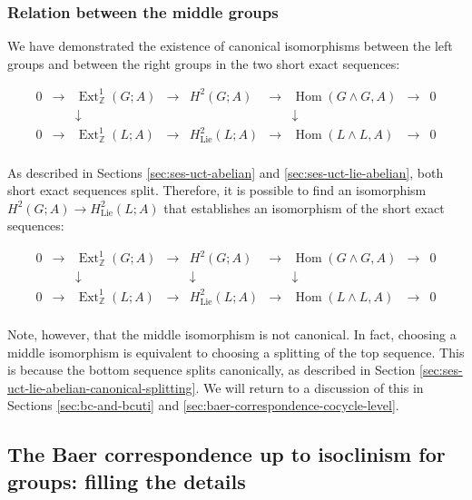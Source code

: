 \subsubsection{Relation between the middle groups}\label{sec:bcuti-extensions-splitting}

We have demonstrated the existence of canonical isomorphisms between
the left groups and between the right groups in the two short exact
sequences:

$$\begin{array}{ccccccccc}
  0 &\to &\operatorname{Ext}^1_{\mathbb{Z}}(G;A) &\to &H^2(G;A) &\to &\operatorname{Hom}(G \wedge G,A) &\to &0\\
  & & \downarrow & & & & \downarrow & & \\
  0 &\to &\operatorname{Ext}^1_{\mathbb{Z}}(L;A) & \to & H^2_{\text{Lie}}(L;A) & \to & \operatorname{Hom}(L \wedge L, A) & \to & 0\\
\end{array}$$

As described in Sections \ref{sec:ses-uct-abelian} and
\ref{sec:ses-uct-lie-abelian}, both short exact sequences
split. Therefore, it is possible to find an isomorphism $H^2(G;A) \to
H^2_{\text{Lie}}(L;A)$ that establishes an isomorphism of the short
exact sequences:

$$\begin{array}{ccccccccc}
  0 &\to &\operatorname{Ext}^1_{\mathbb{Z}}(G;A) &\to &H^2(G;A) &\to &\operatorname{Hom}(G \wedge G,A) &\to &0\\
  & & \downarrow & & \downarrow & & \downarrow & & \\
  0 &\to &\operatorname{Ext}^1_{\mathbb{Z}}(L;A) & \to & H^2_{\text{Lie}}(L;A) & \to & \operatorname{Hom}(L \wedge L, A) & \to & 0\\
\end{array}$$

Note, however, that the middle isomorphism is not canonical. In fact,
choosing a middle isomorphism is equivalent to choosing a splitting of
the top sequence. This is because the bottom sequence splits
canonically, as described in Section
\ref{sec:ses-uct-lie-abelian-canonical-splitting}.  We will return to
a discussion of this in Sections \ref{sec:bc-and-bcuti} and
\ref{sec:baer-correspondence-cocycle-level}.

\subsection{The Baer correspondence up to isoclinism for groups: filling the details}

